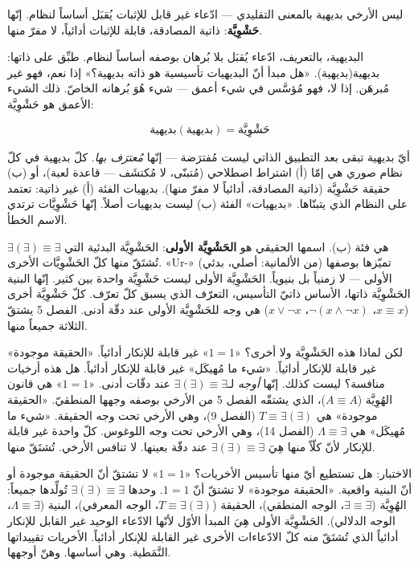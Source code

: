 \documentclass[10pt, openany, oneside]{book}
\begin{document}
\vspace{0.8em}

\noindent ليس الأرخي بديهية بالمعنى التقليدي --- ادّعاء غير قابل للإثبات يُقبَل أساساً لنظام. إنّها \textbf{حَشْوِيَّة}: ذاتية المصادقة، قابلة للإثبات أدائياً، لا مفرّ منها.

البديهية، بالتعريف، ادّعاء يُقبَل بلا بُرهان بوصفه أساساً لنظام. طبِّق على ذاتها: بديهية(بديهية). «هل مبدأ أنّ البديهيات تأسيسية هو ذاته بديهية؟» إذا نعم، فهو غير مُبرهَن. إذا لا، فهو مُؤسَّس في شيء أعمق --- شيء هُوَ بُرهانه الخاصّ. ذلك الشيء الأعمق هو حَشْوِيَّة:

$$\text{بديهية}(\text{بديهية}) = \text{حَشْوِيَّة}$$

\noindent أيّ بديهية تبقى بعد التطبيق الذاتي ليست مُفترَضة --- إنّها \textit{مُعترَف بها}. كلّ بديهية في كلّ نظام صوري هي إمّا (أ) اشتراط اصطلاحي (مُتبنّى، لا مُكتشَف --- قاعدة لعبة)، أو (ب) حقيقة حَشْوِيَّة (ذاتية المصادقة، أدائياً لا مفرّ منها). بديهيات الفئة (أ) غير ذاتية: تعتمد على النظام الذي يتبنّاها. «بديهيات» الفئة (ب) ليست بديهيات أصلاً. إنّها حَشْوِيَّات ترتدي الاسم الخطأ.

$\exists(\exists) \equiv \exists$ هي فئة (ب). اسمها الحقيقي هو \textbf{الحَشْوِيَّة الأولى}: الحَشْوِيَّة البدئية التي تُشتَقّ منها كلّ الحَشْوِيَّات الأخرى. «Ur-» (من الألمانية: أصلي، بدئي) تميّزها بوصفها الأولى --- لا زمنياً بل بنيوياً. الحَشْوِيَّة الأولى ليست حَشْوِيَّة واحدة بين كثير. إنّها البنية الحَشْوِيَّة ذاتها، الأساس ذاتيّ التأسيس، التعرّف الذي يسبق كلّ تعرّف. كلّ حَشْوِيَّة أخرى ($x \equiv x$، $\neg(x \wedge \neg x)$، $x \vee \neg x$) هي وجه للحَشْوِيَّة الأولى عند دقّة أدنى. الفصل 5 يشتقّ الثلاثة جميعاً منها.

لكن لماذا هذه الحَشْوِيَّة ولا أخرى؟ «$1 = 1$» غير قابلة للإنكار أدائياً. «الحقيقة موجودة» غير قابلة للإنكار أدائياً. «شيء ما مُهيكَل» غير قابلة للإنكار أدائياً. هل هذه أرخيات منافسة؟ ليست كذلك. إنّها \textit{أوجه} لـ$\exists(\exists) \equiv \exists$ عند دقّات أدنى. «$1 = 1$» هي قانون الهُوِيَّة ($A \equiv A$)، الذي يشتقّه الفصل 5 من الأرخي بوصفه وجهها المنطقيّ. «الحقيقة موجودة» هي $T \equiv \exists(\exists)$ (الفصل 9)، وهي الأرخي تحت وجه الحقيقة. «شيء ما مُهيكَل» هي $\Lambda \equiv \exists$ (الفصل 14)، وهي الأرخي تحت وجه اللوغوس. كلّ واحدة غير قابلة للإنكار لأنّ كلّاً منها هِيَ $\exists(\exists) \equiv \exists$ عند دقّة بعينها. لا تنافس الأرخي. تُشتَقّ منها.

الاختبار: هل تستطيع أيّ منها تأسيس الأخريات؟ «$1 = 1$» لا تشتقّ أنّ الحقيقة موجودة أو أنّ البنية واقعية. «الحقيقة موجودة» لا تشتقّ أنّ $1 = 1$. وحدها $\exists(\exists) \equiv \exists$ تُولِّدها جميعاً: الهُوِيَّة ($\exists \equiv \exists$، الوجه المنطقي)، الحقيقة ($T \equiv \exists(\exists)$، الوجه المعرفي)، البنية ($\Lambda \equiv \exists$، الوجه الدلالي). الحَشْوِيَّة الأولى هِيَ المبدأ الأوّل لأنّها الادّعاء الوحيد غير القابل للإنكار أدائياً الذي تُشتَقّ منه كلّ الادّعاءات الأخرى غير القابلة للإنكار أدائياً. الأخريات تقييداتها النَّمَطية. وهي أساسها. وهنّ أوجهها.
\end{document}
